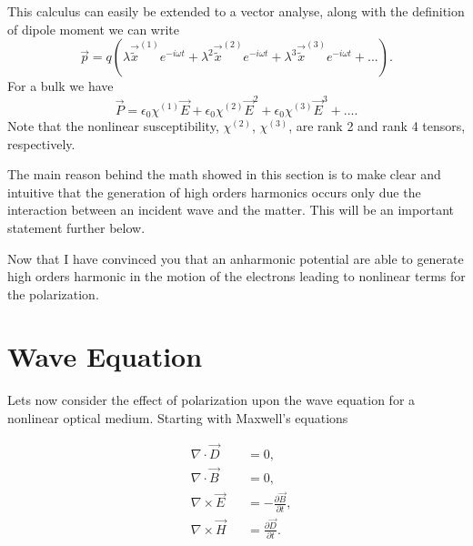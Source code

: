 This calculus can easily be extended to a vector analyse, along with the definition of dipole moment we can write
\begin{equation}
    \vec{p} = q\left(\lambda\vec{\tilde{x}}^{(1)}e^{-i\omega t}+\lambda^2\vec{\tilde{x}}^{(2)}e^{-i\omega t}+\lambda^3\vec{\tilde{x}}^{(3)}e^{-i\omega t}+... \right).
\end{equation}
For a bulk we have
\begin{equation}
    \vec{P} = \epsilon_0\chi^{(1)}\vec{E} + \epsilon_0\chi^{(2)}\vec{E}^2+\epsilon_0\chi^{(3)}\vec{E}^3+....
\label{eq:nonlim_pol}
\end{equation}
Note that the nonlinear susceptibility, $\chi^{(2)}$, $\chi^{(3)}$, are rank 2 and rank 4 tensors, respectively.

The main reason behind the math showed in this section is to make clear and intuitive that the generation of high orders harmonics occurs only due the interaction between an incident wave and the matter. This will be an important statement further below. 

Now that I have convinced you that an anharmonic potential are able to generate high orders harmonic in the motion of the electrons leading to nonlinear terms for the polarization.%

\section{Wave Equation}

Lets now consider the effect of polarization upon the wave equation for a nonlinear optical medium. Starting with Maxwell's equations

\begin{subequations}
    \begin{alignat}{2}
        &\nabla\cdot\vec{D}  &&= 0,\\
        &\nabla\cdot\vec{B}  &&= 0,\\
        &\nabla\times\vec{E} &&= -\frac{\partial\vec{B}}{\partial t},\\ 
        &\nabla\times\vec{H} &&= \frac{\partial\vec{D}}{\partial t}.
    \end{alignat}
    \label{eq:max_eq}
\end{subequations}

